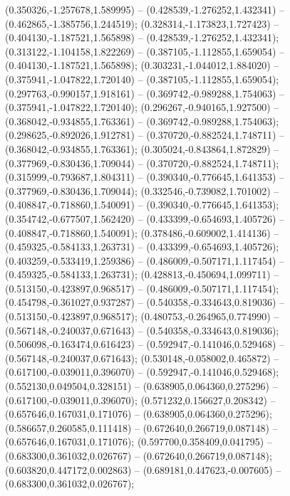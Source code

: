  (0.350326,-1.257678,1.589995) -- (0.428539,-1.276252,1.432341) -- (0.462865,-1.385756,1.244519);
 (0.328314,-1.173823,1.727423) -- (0.404130,-1.187521,1.565898) -- (0.428539,-1.276252,1.432341);
 (0.313122,-1.104158,1.822269) -- (0.387105,-1.112855,1.659054) -- (0.404130,-1.187521,1.565898);
 (0.303231,-1.044012,1.884020) -- (0.375941,-1.047822,1.720140) -- (0.387105,-1.112855,1.659054);
 (0.297763,-0.990157,1.918161) -- (0.369742,-0.989288,1.754063) -- (0.375941,-1.047822,1.720140);
 (0.296267,-0.940165,1.927500) -- (0.368042,-0.934855,1.763361) -- (0.369742,-0.989288,1.754063);
 (0.298625,-0.892026,1.912781) -- (0.370720,-0.882524,1.748711) -- (0.368042,-0.934855,1.763361);
 (0.305024,-0.843864,1.872829) -- (0.377969,-0.830436,1.709044) -- (0.370720,-0.882524,1.748711);
 (0.315999,-0.793687,1.804311) -- (0.390340,-0.776645,1.641353) -- (0.377969,-0.830436,1.709044);
 (0.332546,-0.739082,1.701002) -- (0.408847,-0.718860,1.540091) -- (0.390340,-0.776645,1.641353);
 (0.354742,-0.677507,1.562420) -- (0.433399,-0.654693,1.405726) -- (0.408847,-0.718860,1.540091);
 (0.378486,-0.609002,1.414136) -- (0.459325,-0.584133,1.263731) -- (0.433399,-0.654693,1.405726);
 (0.403259,-0.533419,1.259386) -- (0.486009,-0.507171,1.117454) -- (0.459325,-0.584133,1.263731);
 (0.428813,-0.450694,1.099711) -- (0.513150,-0.423897,0.968517) -- (0.486009,-0.507171,1.117454);
 (0.454798,-0.361027,0.937287) -- (0.540358,-0.334643,0.819036) -- (0.513150,-0.423897,0.968517);
 (0.480753,-0.264965,0.774990) -- (0.567148,-0.240037,0.671643) -- (0.540358,-0.334643,0.819036);
 (0.506098,-0.163474,0.616423) -- (0.592947,-0.141046,0.529468) -- (0.567148,-0.240037,0.671643);
 (0.530148,-0.058002,0.465872) -- (0.617100,-0.039011,0.396070) -- (0.592947,-0.141046,0.529468);
 (0.552130,0.049504,0.328151) -- (0.638905,0.064360,0.275296) -- (0.617100,-0.039011,0.396070);
 (0.571232,0.156627,0.208342) -- (0.657646,0.167031,0.171076) -- (0.638905,0.064360,0.275296);
 (0.586657,0.260585,0.111418) -- (0.672640,0.266719,0.087148) -- (0.657646,0.167031,0.171076);
 (0.597700,0.358409,0.041795) -- (0.683300,0.361032,0.026767) -- (0.672640,0.266719,0.087148);
 (0.603820,0.447172,0.002863) -- (0.689181,0.447623,-0.007605) -- (0.683300,0.361032,0.026767);
